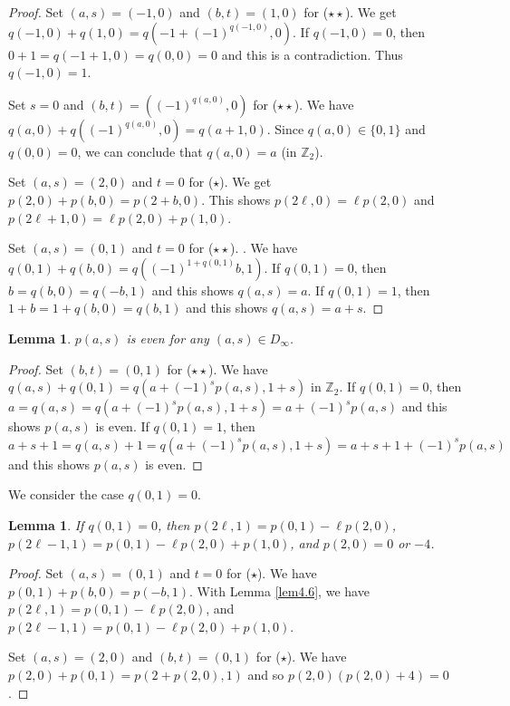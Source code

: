 \documentclass[12pt]{amsart}
\newtheorem{lemm}[thm]{Lemma}
\theoremstyle{definition}
\newcommand{\Z}{\mathbb{Z}}
\begin{document}
\begin{proof}
  Set $(a,s)=(-1,0)$ and $(b,t)=(1,0)$ for  ($\star\star$).
  We get $q(-1,0)+q(1,0)=q(-1+(-1)^{q(-1,0)},0)$.
  If $q(-1,0)=0$, then $0+1=q(-1+1,0)=q(0,0)=0$ and this is a contradiction.
  Thus $q(-1,0)=1$.
  
  Set $s=0$ and $(b,t)=((-1)^{q(a,0)},0)$  for ($\star\star$). 
  We have $q(a,0)+q((-1)^{q(a,0)},0)=q(a+1,0)$.
  Since $q(a,0)\in \{0, 1\}$ and $q(0,0)=0$,
  we can conclude that $q(a,0)=a$ (in $\Z_2$).

  Set $(a,s)=(2,0)$ and $t=0$ for ($\star$).
  We get $p(2,0)+p(b,0)=p(2+b,0)$.
  This shows $p(2\ell,0)=\ell p(2,0)$ and
  $p(2\ell +1, 0)=\ell p(2,0)+p(1,0)$.

  Set $(a,s)=(0,1)$ and $t=0$ for ($\star\star$). .
  We have $q(0,1)+q(b,0)=q((-1)^{1+q(0,1)}b,1)$.
  If $q(0,1)=0$, then $b=q(b,0)=q(-b,1)$ and this shows $q(a,s)=a$.
  If $q(0,1)=1$, then $1+b=1+q(b,0)=q(b,1)$ and this shows $q(a,s)=a+s$.
\end{proof}

\begin{lemm}\label{lem4.7}
  $p(a,s)$ is even for any $(a,s)\in D_\infty$.
\end{lemm}

\begin{proof}
  Set $(b,t)=(0,1)$ for ($\star\star$).
  We have $q(a,s)+q(0,1)=q(a+(-1)^sp(a,s),1+s)$ in $\Z_2$.
  If $q(0,1)=0$, then $a=q(a,s)=q(a+(-1)^sp(a,s),1+s)=a+(-1)^sp(a,s)$
  and this shows $p(a,s)$ is even.
  If $q(0,1)=1$, then $a+s+1=q(a,s)+1=q(a+(-1)^sp(a,s),1+s)=a+s+1+(-1)^sp(a,s)$
  and this shows $p(a,s)$ is even.
\end{proof}

We consider the case $q(0,1)=0$.

\begin{lemm}\label{lem4.8}
  If $q(0,1)=0$, then $p(2\ell,1) = p(0,1)-\ell p(2,0)$,
  $p(2\ell-1,1)= p(0,1)-\ell p(2,0)+p(1,0)$,
  and $p(2,0)=0$ or $-4$.
\end{lemm}

\begin{proof}
  Set $(a,s)=(0,1)$ and $t=0$ for ($\star$).
  We have $p(0,1)+p(b,0)=p(-b,1)$.
  With Lemma \ref{lem4.6}, we have $p(2\ell,1) = p(0,1)-\ell p(2,0)$, and
  $p(2\ell-1,1)= p(0,1)-\ell p(2,0)+p(1,0)$.

  Set $(a,s)=(2,0)$ and $(b,t)=(0,1)$ for ($\star$).
  We have $p(2,0)+p(0,1)=p(2+p(2,0),1)$ and so
  $p(2,0)(p(2,0)+4)=0$.
\end{proof}
\end{document}
